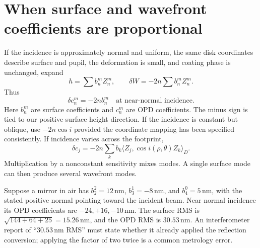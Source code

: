 \section{When surface and wavefront coefficients are proportional}
If the incidence is approximately normal and uniform, the same disk
coordinates describe surface and pupil, the deformation is small, and
coating phase is unchanged, expand
\begin{equation}
 h=\sum b_n^mZ_n^m,\qquad
 \delta W=-2n\sum b_n^mZ_n^m.
\end{equation}
Thus
\begin{equation}
 \boxed{\delta c_n^m=-2n b_n^m}\quad\text{at near-normal incidence}.
 \label{zc:surfacewavecoeff}
\end{equation}
Here $b_n^m$ are surface coefficients and $c_n^m$ are OPD coefficients.
The minus sign is tied to our positive surface height direction.
If the incidence is constant but oblique, use $-2n\cos i$ provided
the coordinate mapping has been specified consistently. If incidence
varies across the footprint,
\begin{equation}
 \delta c_j=-2n\sum_k b_k
           \langle Z_j,\cos i(\rho,\theta)Z_k\rangle_D.
 \label{zc:mirrorcoupling}
\end{equation}
Multiplication by a nonconstant sensitivity mixes modes. A single
surface mode can then produce several wavefront modes.

Suppose a mirror in air has $b_2^2=12\,\mathrm{nm}$,
$b_3^1=-8\,\mathrm{nm}$, and $b_4^0=5\,\mathrm{nm}$, with the
stated positive normal pointing toward the incident beam. Near normal
incidence its OPD coefficients are $-24,+16,-10\,\mathrm{nm}$.
The surface RMS is $\sqrt{144+64+25}=15.26\,\mathrm{nm}$, and
the OPD RMS is $30.53\,\mathrm{nm}$. An interferometer report of
``$30.53\,\mathrm{nm}$ RMS'' must state whether it already applied the
reflection conversion; applying the factor of two twice is a common
metrology error.

